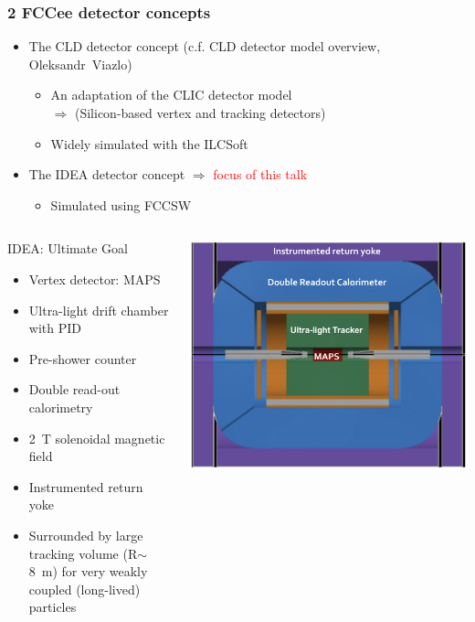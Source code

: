 \documentclass[aspectratio=169, hyperref={colorlinks=true,pdfpagelabels=false,linkcolor=black}, xcolor=dvipsnames,10pt]{beamer}
\begin{document}
\begin{frame}
	\frametitle{2 FCCee detector concepts}
	
		\begin{itemize}
		\item The CLD detector concept (c.f. CLD detector model overview, Oleksandr~Viazlo)
			\begin{itemize}
			\item An adaptation of the CLIC detector model 
			\\ $\Rightarrow$ (Silicon-based vertex and tracking detectors)
			\item Widely simulated with the ILCSoft
			\end{itemize}
		\item The IDEA detector concept $\Rightarrow$ \textcolor{Red}{focus of this talk}
			\begin{itemize}
			\item Simulated using FCCSW
			\end{itemize}
		\end{itemize}

	
	\begin{columns}
	
	\begin{block}{IDEA: Ultimate Goal}
	\begin{itemize}
	\item Vertex detector: MAPS
	\item Ultra-light drift chamber with PID
	\item Pre-shower counter
	\item Double read-out calorimetry
	\item 2~T solenoidal magnetic field
	\item Instrumented return yoke
	\item Surrounded by large tracking volume (R$\sim$8~m) for very weakly coupled (long-lived) particles
	\end{itemize}
	\end{block}
	\centering
	\includegraphics[width=\textwidth]{../figures/FCCeeIDEAConcept.png}
	\end{columns}


\end{frame}
\end{document}
